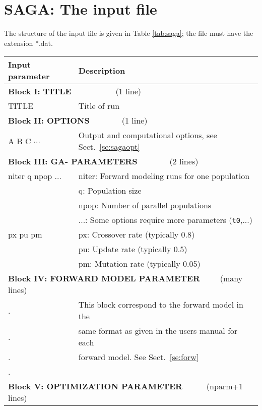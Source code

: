 \documentclass{saclantc}
\begin{document}
\newpage
\section{SAGA: The input file}
The structure of the input file is given in Table \ref{tab:saga}; the file must
have the extension *.dat.

\begin{table}
\begin{center}
\small
\begin{tabular}{|l|l|}
\hline \hline
Input parameter & Description \\
\hline \hline

\multicolumn{2}{|l|}{{\bf Block I: TITLE}~~~~~~~~~~~(1 line)}  \\ \hline
TITLE & Title of run  \\
\hline
\multicolumn{2}{|l|}{{\bf Block II: OPTIONS}~~~~~~~~(1 line)} \\ \hline
A B C $\cdots$ & Output and computational options, see Sect.\ \ref{se:sagaopt}   \\
\hline
\multicolumn{2}{|l|}{{\bf Block III: GA- PARAMETERS}~~~~~~~~(2 lines)}  \\ \hline
niter q npop ...& niter: Forward modeling runs for one
population  \\
 	& q: Population size \\
 	& npop: Number of parallel populations  \\
        & ...: Some options require more parameters  
          ({\tt t0},...)\\
px pu pm& px:  Crossover rate (typically 0.8) \\
        & pu:  Update rate (typically 0.5)    \\
        & pm:  Mutation rate (typically 0.05) \\
\hline
\multicolumn{2}{|l|}{{\bf Block IV: FORWARD MODEL PARAMETER}~~~~~(many lines)} \\ \hline
.       & This block correspond to the forward model in the   \\
.        &  same format as given in the users manual for each  \\
.        & forward model. See  Sect.\ \ref{se:forw}    \\
.	 &  \\ 
\hline
\multicolumn{2}{|l|}{{\bf Block V: OPTIMIZATION
                                  PARAMETER}~~~~~~(nparm+1 lines)}\\ \hline

\end{tabular}
\end{center}
\end{table}
\end{document}
